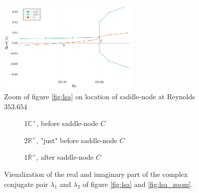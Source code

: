 \begin{figure}[h]
  \centering
  \includegraphics[width=0.6\textwidth]{figs/lsa_sn_zoom96x96.png}
  \caption{Zoom of figure \ref{fig:lsa} on location of saddle-node at Reynolds $353.654$} 
  \label{fig:lsa_sn_zoom}
\end{figure}

\begin{figure}[h]
\centering
\begin{subfigure}[b]{0.3\textwidth}
  \centering
  \caption{$1\mathbb{C}^+$, before saddle-node $C$ \newline}
\end{subfigure}
\begin{subfigure}[b]{0.3\textwidth}
  \centering
\caption{$2\mathbb{R}^+$, "just" before saddle-node $C$}
\end{subfigure}
\begin{subfigure}[b]{0.3\textwidth}
  \centering
\caption{$1\mathbb{R}^+$, after saddle-node $C$ \newline}
\end{subfigure}
\caption{Visualization of the real and imaginary part of the complex conjugate pair
  $\lambda_1$ and $\lambda_2$ of figure \ref{fig:lsa} and \ref{fig:lsa_zoom}.}
\label{fig:complexplane}
\end{figure} 

